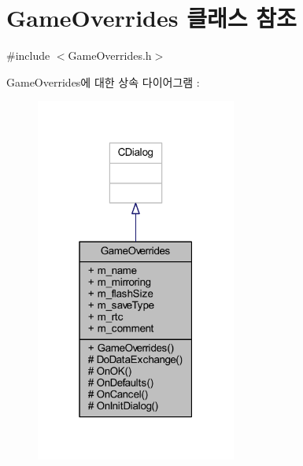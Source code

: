 \hypertarget{class_game_overrides}{}\section{Game\+Overrides 클래스 참조}
\label{class_game_overrides}


{\ttfamily \#include $<$Game\+Overrides.\+h$>$}



Game\+Overrides에 대한 상속 다이어그램 \+: \nopagebreak
\begin{figure}[H]
\begin{center}
\leavevmode
\includegraphics[width=187pt]{class_game_overrides__inherit__graph}
\end{center}
\end{figure}



